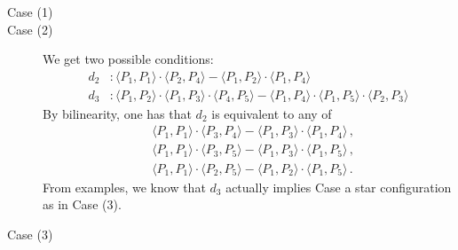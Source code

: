 \documentclass[12pt, a4paper, reqno, captions=tableheading,bibliography=totoc]{scrartcl}
\theoremstyle{plain}
\theoremstyle{definition}
\begin{document}
\begin{description}
 \item[Case (1)]
 \item[Case (2)]
 We get two possible conditions:
 \begin{align}
  d_2 &: \langle P_1, P_1 \rangle\cdot \langle P_2, P_4\rangle -
  \langle P_1, P_2 \rangle \cdot \langle P_1, P_4 \rangle \label{rango9_1} \\
  d_3 &: \langle P_1,P_2 \rangle \cdot \langle P_1,P_3\rangle \cdot
  \langle P_4,P_5\rangle -\langle P_1,P_4\rangle \cdot \langle P_1,P_5\rangle
  \cdot \langle P_2,P_3\rangle  \label{rango9_2}
\end{align}
By bilinearity, one has that $d_2$ is equivalent to any of
\begin{equation}
\begin{aligned}
    & \langle P_1, P_1 \rangle\cdot \langle P_3, P_4\rangle -
  \langle P_1, P_3 \rangle \cdot \langle P_1, P_4 \rangle \,, \\
    & \langle P_1, P_1 \rangle\cdot \langle P_3, P_5\rangle -
  \langle P_1, P_3 \rangle \cdot \langle P_1, P_5 \rangle \,, \\
    & \langle P_1, P_1 \rangle\cdot \langle P_2, P_5\rangle -
  \langle P_1, P_2 \rangle \cdot \langle P_1, P_5 \rangle \,.
\end{aligned}
\end{equation}
From examples, we know that $d_3$ actually implies Case a star configuration as in Case (3).
 \item[Case (3)]

\end{description}



\end{document}
